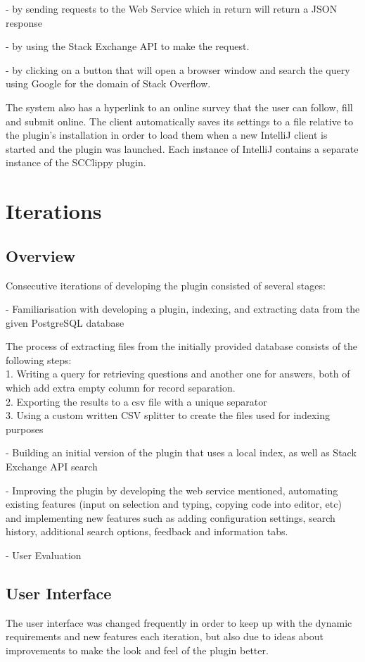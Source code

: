 \documentclass{l4proj}
\begin{document}
- by sending requests to the Web Service which in return will return a JSON response

- by using the Stack Exchange API to make the request.

- by clicking on a button that will open a browser window and search the query using Google for the domain of Stack Overflow. 

The system also has a hyperlink to an online survey that the user can follow, fill and submit online. The client automatically saves its settings to a file relative to the plugin's installation in order to load them when a new IntelliJ client is started and the plugin was launched. Each instance of IntelliJ contains a separate instance of the SCClippy plugin.

\section{Iterations}
\subsection{Overview}
Consecutive iterations of developing the plugin consisted of several stages:

- Familiarisation with developing a plugin, indexing, and extracting data from the given PostgreSQL database

The process of extracting files from the initially provided database consists of the following steps:\\
1. Writing a query for retrieving questions and another one for answers, both of which add extra empty column for record separation.\\
2. Exporting the results to a csv file with a unique separator\\
3. Using a custom written CSV splitter to create the files used for indexing purposes

- Building an initial version of the plugin that uses a local index, as well as Stack Exchange API search

- Improving the plugin by developing the web service mentioned, automating existing features (input on selection and typing, copying code into editor, etc) and implementing new features such as adding configuration settings, search history, additional search options, feedback and information tabs.

- User Evaluation

\subsection{User Interface}
The user interface was changed frequently in order to keep up with the dynamic requirements and new features each iteration, but also due to ideas about improvements to make the look and feel of the plugin better.
\end{document}
